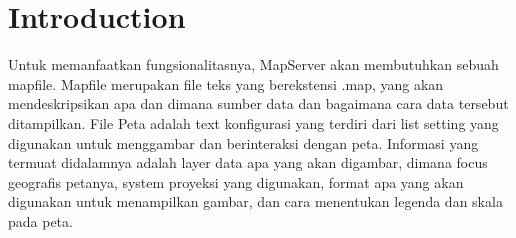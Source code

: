 \section{Introduction}

Untuk memanfaatkan fungsionalitasnya, MapServer akan membutuhkan sebuah mapfile. Mapfile merupakan file teks yang berekstensi .map, yang akan mendeskripsikan apa dan dimana sumber data dan bagaimana cara data tersebut ditampilkan. 
File Peta adalah text konfigurasi yang terdiri dari list setting yang digunakan untuk menggambar dan berinteraksi dengan peta. Informasi yang termuat didalamnya adalah layer data apa yang akan digambar, dimana focus geografis petanya, 
system proyeksi yang digunakan, format apa yang akan digunakan untuk menampilkan gambar, dan cara menentukan legenda dan skala pada peta.

